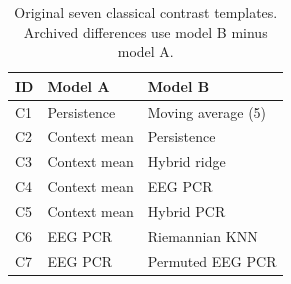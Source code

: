 \begin{table}[!ht]
\centering
\small
\setlength{\tabcolsep}{5pt}
\renewcommand{\arraystretch}{1.1}
\caption{Original seven classical contrast templates. Archived differences use model B minus model A.}
\label{tab:supp_contrasts_classical}
\begin{tabular}{lll}
\toprule
ID & Model A & Model B \\
\midrule
C1 & Persistence & Moving average (5) \\
C2 & Context mean & Persistence \\
C3 & Context mean & Hybrid ridge \\
C4 & Context mean & EEG PCR \\
C5 & Context mean & Hybrid PCR \\
C6 & EEG PCR & Riemannian KNN \\
C7 & EEG PCR & Permuted EEG PCR \\
\bottomrule
\end{tabular}
\end{table}
